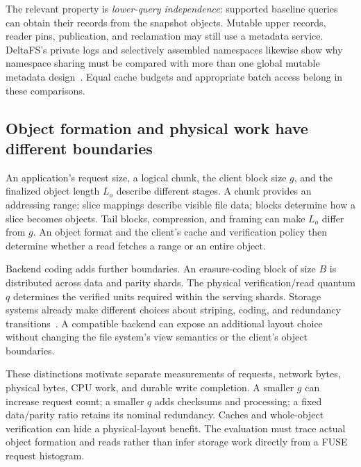 The relevant property is \emph{lower-query independence}: supported baseline
queries can obtain their records from the snapshot objects. Mutable upper
records, reader pins, publication, and reclamation may still use a metadata
service. DeltaFS's private logs and selectively assembled namespaces likewise
show why namespace sharing must be compared with more than one global mutable
metadata design~\cite{deltafs2021}. Equal cache budgets and appropriate batch
access belong in these comparisons.

\subsection{Object formation and physical work have different boundaries}

An application's request size, a logical chunk, the client block size $g$,
and the finalized object length $L_o$ describe different stages. A chunk
provides an addressing range; slice mappings describe visible file data;
blocks determine how a slice becomes objects. Tail blocks, compression,
and framing can make $L_o$ differ from $g$. An object format and the client's
cache and verification policy then determine whether a read fetches a range
or an entire object.

Backend coding adds further boundaries. An erasure-coding block of size $B$
is distributed across data and parity shards. The physical verification/read
quantum $q$ determines the verified units required within the serving shards.
Storage systems already make different choices about striping, coding, and
redundancy transitions~\cite{azureec2012,morph2024,okapi2025}. A compatible
backend can expose an additional layout choice without changing the file
system's view semantics or the client's object boundaries.

These distinctions motivate separate measurements of requests, network
bytes, physical bytes, CPU work, and durable write completion. A smaller $g$
can increase request count; a smaller $q$ adds checksums and processing;
a fixed data/parity ratio retains its nominal redundancy. Caches and
whole-object verification can hide a physical-layout benefit. The evaluation
must trace actual object formation and reads rather than infer storage work
directly from a FUSE request histogram.
